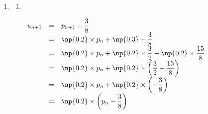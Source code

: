 \begin{enumerate}
\begin{enumerate}
Comme $p_0 = 0 \leqslant \np{0.375}$,  $\mathcal{H}(0)$ est vraie.

\textbf{Montrons que $\mathcal{H}(n)\Rightarrow \mathcal{H}(n+1)$ (hérédité).}

On suppose que $\mathcal{H}(n)$ est vraie, avec $n \in \N$.

$p_{n+1} = \np{0.2}\times p_n + \np{0.3}$

D'après $\mathcal{H}(n)$, $p_n \leqslant \np{0.375}$, en multipliant par $\np{0.2}$ on obtient :

$ \np{0.2}\times p_n \leqslant \np{0.075}$, en ajoutant  $\np{0.3}$ on obtient :

$ \np{0.2}\times p_n + \np{0.3} \leqslant \np{0.375}$, ainsi on obtient :

$p_{n+1} \leqslant \np{0.375} $ ($\mathcal{H}(n+1)$ est vérifiée)

\textbf{D'après le principe de récurrence},

$\forall n\in \N, n \geqslant 0, p_n\leqslant \np{0.375}$
		\item Pour tout $n\in \N$, $p_n$ désignant une probabilité est un nombre positif.

Soit ${n\in\N}$

$p_{n+1}-p_{n} = \np{-0.8}\times p_n + \np{0.3} $

$p_{n+1}-p_{n} \geqslant \np{-0.8}\times \np{0.375} + \np{0.3} $

$p_{n+1}-p_{n} \geqslant 0 $

Ceci étant valable quelque soit le choix de $n$, $\forall n \in \N,~p_{n+1}-p_{n} \geqslant 0 $, donc $\left(p_n\right)$ est croissante.
			\item $\left(p_n\right)$ est croissante et majorée donc $\left(p_n\right)$ est convergente vers $l$. De plus ${l\leqslant \np{0.375}}$.
		\end{enumerate}
	\item
		\begin{enumerate}
			\item \ {}
			
			\renewcommand{\arraystretch}{2}
			$\begin{array}{rcl}
			u_{n+1} 	&=& p_{n+1} - \dfrac{3}{8}\\
					&=& \np{0.2}\times p_n + \np{0.3} - \dfrac{3}{8}\\
					&=& \np{0.2}\times p_n +\np{0.2}\times \dfrac{3}{2} - \np{0.2}\times\dfrac{15}{8}\\
					&=& \np{0.2}\times p_n +\np{0.2}\times\left( \dfrac{3}{2} - \dfrac{15}{8}\right)\\
					&=& \np{0.2}\times p_n +\np{0.2}\times\left(  - \dfrac{3}{8}\right)\\
					&=& \np{0.2}\times \left(p_n - \dfrac{3}{8}\right)\\
			\end{array}$


\end{enumerate}
\end{enumerate}

